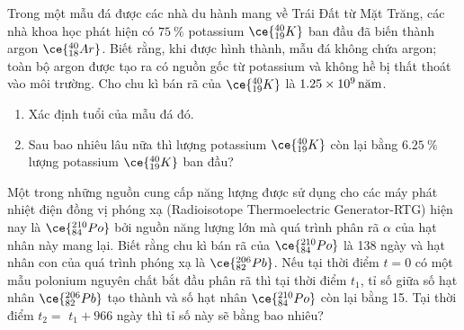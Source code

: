 \begin{ex}
	Trong một mẫu đá được các nhà du hành mang về Trái Đất từ Mặt Trăng, các nhà khoa học phát hiện có $\SI{75}{\percent}$ potassium $\ce{_{19}^{40}K}$ ban đầu đã biến thành argon $\ce{_{18}^{40}Ar}$. Biết rằng, khi được hình thành, mẫu đá không chứa argon; toàn bộ argon được tạo ra có nguồn gốc từ potassium và không hề bị thất thoát vào môi trường. Cho chu kì bán rã của $\ce{_{19}^{40}K}$ là $\SI{1.25E9}{\text{năm}}$.
	\begin{enumerate}[label=\alph*)]
		\item Xác định tuổi của mẫu đá đó.
		\item Sau bao nhiêu lâu nữa thì lượng potassium $\ce{_{19}^{40}K}$ còn lại bằng $\SI{6.25}{\percent}$ lượng potassium $\ce{_{19}^{40}K}$ ban đầu?
	\end{enumerate}
\end{ex}
\begin{ex}
	Một trong những nguồn cung cấp năng lượng được sử dụng cho các máy phát nhiệt điện đồng vị phóng xạ (Radioisotope Thermoelectric Generator-RTG) hiện nay là $\ce{_{84}^{210}Po}$ bởi nguồn năng lượng lớn mà quá trình phân rã $\alpha$ của hạt nhân này mang lại. Biết rằng chu kì bán rã của $\ce{_{84}^{210}Po}$ là 138 ngày và hạt nhân con của quá trình phóng xạ là $\ce{_{82}^{206}Pb}$. Nếu tại thời điểm $t=0$ có một mẫu polonium nguyên chất bắt đầu phân rã thì tại thời điểm $t_1$, tỉ số giữa số hạt nhân $\ce{_{82}^{206}Pb}$ tạo thành và số hạt nhân $\ce{_{84}^{210}Po}$ còn lại bằng 15. Tại thời điểm $t_2=$ $t_1+966$ ngày thì tỉ số này sẽ bằng bao nhiêu?	
\end{ex}
